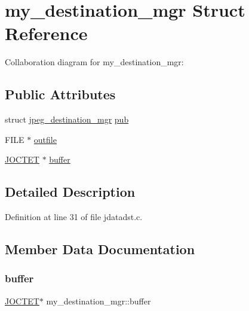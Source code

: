 \hypertarget{structmy__destination__mgr}{}\section{my\+\_\+destination\+\_\+mgr Struct Reference}
\label{structmy__destination__mgr}


Collaboration diagram for my\+\_\+destination\+\_\+mgr\+:
\subsection*{Public Attributes}
\begin{DoxyCompactItemize}
\item 
struct \mbox{\hyperlink{structjpeg__destination__mgr}{jpeg\+\_\+destination\+\_\+mgr}} \mbox{\hyperlink{structmy__destination__mgr_a79800f27d02bb0446203ecf552034980}{pub}}
\item 
F\+I\+LE $\ast$ \mbox{\hyperlink{structmy__destination__mgr_a759400870db2885a9c7cf49d8d3ce38e}{outfile}}
\item 
\mbox{\hyperlink{jmorecfg_8h_a356ad249f20e691b520da439f92cccbc}{J\+O\+C\+T\+ET}} $\ast$ \mbox{\hyperlink{structmy__destination__mgr_aa93f525223299889fb3e491a7df3d412}{buffer}}
\end{DoxyCompactItemize}


\subsection{Detailed Description}


Definition at line 31 of file jdatadst.\+c.



\subsection{Member Data Documentation}
\mbox{\label{structmy__destination__mgr_aa93f525223299889fb3e491a7df3d412}} 
\subsubsection{\texorpdfstring{buffer}{buffer}}
{\footnotesize\ttfamily \mbox{\hyperlink{jmorecfg_8h_a356ad249f20e691b520da439f92cccbc}{J\+O\+C\+T\+ET}}$\ast$ my\+\_\+destination\+\_\+mgr\+::buffer}



